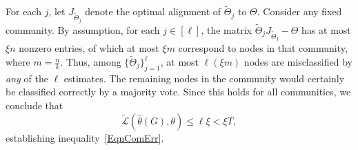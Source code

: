 \documentclass{article}
\newcommand{\thetahat}{\ensuremath{\widehat{\theta}}}
\begin{document}
For each $j$, let $J_{\widetilde{\Theta}_j}$ denote the optimal alignment of $\widetilde{\Theta}_j$ to $\Theta$. Consider any fixed community. By assumption, for each $j \in [\ell]$, the matrix $\widetilde{\Theta}_j J_{\widetilde{\Theta}_j} - \Theta$ has at most $\xi n$ nonzero entries, of which at most $\xi m$ correspond to nodes in that community, where $m = \frac{n}{k}$. Thus, among $\{\widetilde{\Theta}_j\}_{j=1}^{\ell}$, at most $\ell(\xi m)$ nodes are misclassified by \emph{any} of the $\ell$ estimates. The remaining nodes in the community would certainly be classified correctly by a majority vote. Since this holds for all communities, we conclude that
\begin{equation*}
\widetilde{\mathcal{L}}(\thetahat(G), \theta) \le \ell \xi < \xi T,
\end{equation*}
establishing inequality~\eqref{EqnComErr}.

\end{document}
